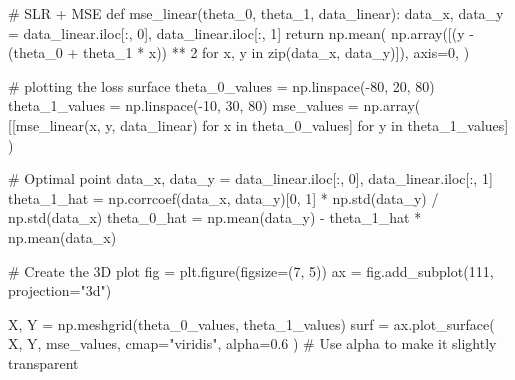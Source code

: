 \documentclass[
  letterpaper,
  DIV=11,
  numbers=noendperiod]{scrreprt}
\newenvironment{Shaded}{\begin{snugshade}}{\end{snugshade}}
\newcommand{\BuiltInTok}[1]{\textcolor[rgb]{0.00,0.23,0.31}{#1}}
\newcommand{\CommentTok}[1]{\textcolor[rgb]{0.37,0.37,0.37}{#1}}
\newcommand{\ControlFlowTok}[1]{\textcolor[rgb]{0.00,0.23,0.31}{#1}}
\newcommand{\DecValTok}[1]{\textcolor[rgb]{0.68,0.00,0.00}{#1}}
\newcommand{\FloatTok}[1]{\textcolor[rgb]{0.68,0.00,0.00}{#1}}
\newcommand{\KeywordTok}[1]{\textcolor[rgb]{0.00,0.23,0.31}{#1}}
\newcommand{\NormalTok}[1]{\textcolor[rgb]{0.00,0.23,0.31}{#1}}
\newcommand{\OperatorTok}[1]{\textcolor[rgb]{0.37,0.37,0.37}{#1}}
\newcommand{\StringTok}[1]{\textcolor[rgb]{0.13,0.47,0.30}{#1}}
\begin{document}
\begin{Shaded}
\begin{Highlighting}[]
\CommentTok{\# SLR + MSE}
\KeywordTok{def}\NormalTok{ mse\_linear(theta\_0, theta\_1, data\_linear):}
\NormalTok{    data\_x, data\_y }\OperatorTok{=}\NormalTok{ data\_linear.iloc[:, }\DecValTok{0}\NormalTok{], data\_linear.iloc[:, }\DecValTok{1}\NormalTok{]}
    \ControlFlowTok{return}\NormalTok{ np.mean(}
\NormalTok{        np.array([(y }\OperatorTok{{-}}\NormalTok{ (theta\_0 }\OperatorTok{+}\NormalTok{ theta\_1 }\OperatorTok{*}\NormalTok{ x)) }\OperatorTok{**} \DecValTok{2} \ControlFlowTok{for}\NormalTok{ x, y }\KeywordTok{in} \BuiltInTok{zip}\NormalTok{(data\_x, data\_y)]),}
\NormalTok{        axis}\OperatorTok{=}\DecValTok{0}\NormalTok{,}
\NormalTok{    )}


\CommentTok{\# plotting the loss surface}
\NormalTok{theta\_0\_values }\OperatorTok{=}\NormalTok{ np.linspace(}\OperatorTok{{-}}\DecValTok{80}\NormalTok{, }\DecValTok{20}\NormalTok{, }\DecValTok{80}\NormalTok{)}
\NormalTok{theta\_1\_values }\OperatorTok{=}\NormalTok{ np.linspace(}\OperatorTok{{-}}\DecValTok{10}\NormalTok{, }\DecValTok{30}\NormalTok{, }\DecValTok{80}\NormalTok{)}
\NormalTok{mse\_values }\OperatorTok{=}\NormalTok{ np.array(}
\NormalTok{    [[mse\_linear(x, y, data\_linear) }\ControlFlowTok{for}\NormalTok{ x }\KeywordTok{in}\NormalTok{ theta\_0\_values] }\ControlFlowTok{for}\NormalTok{ y }\KeywordTok{in}\NormalTok{ theta\_1\_values]}
\NormalTok{)}

\CommentTok{\# Optimal point}
\NormalTok{data\_x, data\_y }\OperatorTok{=}\NormalTok{ data\_linear.iloc[:, }\DecValTok{0}\NormalTok{], data\_linear.iloc[:, }\DecValTok{1}\NormalTok{]}
\NormalTok{theta\_1\_hat }\OperatorTok{=}\NormalTok{ np.corrcoef(data\_x, data\_y)[}\DecValTok{0}\NormalTok{, }\DecValTok{1}\NormalTok{] }\OperatorTok{*}\NormalTok{ np.std(data\_y) }\OperatorTok{/}\NormalTok{ np.std(data\_x)}
\NormalTok{theta\_0\_hat }\OperatorTok{=}\NormalTok{ np.mean(data\_y) }\OperatorTok{{-}}\NormalTok{ theta\_1\_hat }\OperatorTok{*}\NormalTok{ np.mean(data\_x)}

\CommentTok{\# Create the 3D plot}
\NormalTok{fig }\OperatorTok{=}\NormalTok{ plt.figure(figsize}\OperatorTok{=}\NormalTok{(}\DecValTok{7}\NormalTok{, }\DecValTok{5}\NormalTok{))}
\NormalTok{ax }\OperatorTok{=}\NormalTok{ fig.add\_subplot(}\DecValTok{111}\NormalTok{, projection}\OperatorTok{=}\StringTok{"3d"}\NormalTok{)}

\NormalTok{X, Y }\OperatorTok{=}\NormalTok{ np.meshgrid(theta\_0\_values, theta\_1\_values)}
\NormalTok{surf }\OperatorTok{=}\NormalTok{ ax.plot\_surface(}
\NormalTok{    X, Y, mse\_values, cmap}\OperatorTok{=}\StringTok{"viridis"}\NormalTok{, alpha}\OperatorTok{=}\FloatTok{0.6}
\NormalTok{)  }\CommentTok{\# Use alpha to make it slightly transparent}


\end{Highlighting}
\end{Shaded}
\end{document}
